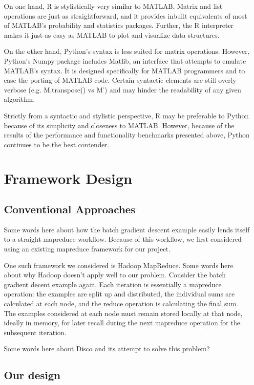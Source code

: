 \documentclass[%
        final,
        notitlepage,
        narroweqnarray,
        inline,
        ]{ieee}
\begin{document}
On one hand, R is stylistically very similar to MATLAB. Matrix and list
operations are just as straightforward, and it provides inbuilt equivalents of
most of MATLAB's probability and statistics packages. Further, the R interpreter
makes it just as easy as MATLAB to plot and visualize data structures.

On the other hand, Python's syntax is less suited for matrix operations.
However, Python's Numpy package includes Matlib, an interface that attempts to
emulate MATLAB's syntax. It is designed specifically for MATLAB programmers and
to ease the porting of MATLAB code. Certain syntactic elements are still overly
verbose (e.g. M.transpose() vs M') and may hinder the readability of any given
algorithm.

Strictly from a syntactic and stylistic perspective, R may be preferable to
Python because of its simplicity and closeness to MATLAB. However, because
of the results of the performance and functionality benchmarks presented above,
Python continues to be the best contender.

\section{Framework Design}

\subsection{Conventional Approaches}

Some words here about how the batch gradient descent example easily lends
itself to a straight mapreduce workflow. Because of this workflow, we first
considered using an existing mapreduce framework for our project.

One such framework we considered is Hadoop MapReduce. Some words here about why
Hadoop doesn't apply well to our problem. Consider the batch gradient decent
example again. Each iteration is essentially a mapreduce operation: the
examples are split up and distributed, the individual sums are calculated at
each node, and the reduce operation is calculating the final sum. The examples
considered at each node must remain stored locally at that node, ideally in
memory, for later recall during the next mapreduce operation for the subsequent
iteration.

Some words here about Disco and its attempt to solve this problem?

\subsection{Our design}
\end{document}
